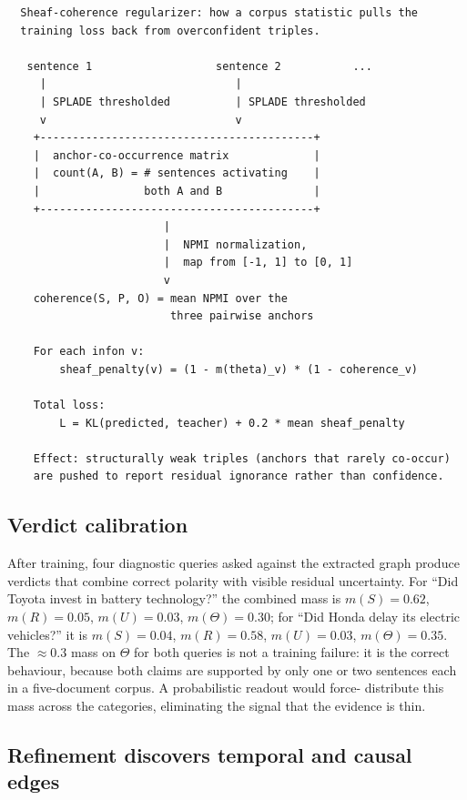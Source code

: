 \documentclass[11pt,a4paper]{article}
\begin{document}
\begin{verbatim}
  Sheaf-coherence regularizer: how a corpus statistic pulls the
  training loss back from overconfident triples.

   sentence 1                   sentence 2           ...
     |                             |
     | SPLADE thresholded          | SPLADE thresholded
     v                             v
    +------------------------------------------+
    |  anchor-co-occurrence matrix             |
    |  count(A, B) = # sentences activating    |
    |                both A and B              |
    +------------------------------------------+
                        |
                        |  NPMI normalization,
                        |  map from [-1, 1] to [0, 1]
                        v
    coherence(S, P, O) = mean NPMI over the
                         three pairwise anchors

    For each infon v:
        sheaf_penalty(v) = (1 - m(theta)_v) * (1 - coherence_v)

    Total loss:
        L = KL(predicted, teacher) + 0.2 * mean sheaf_penalty

    Effect: structurally weak triples (anchors that rarely co-occur)
    are pushed to report residual ignorance rather than confidence.
\end{verbatim}

\subsection{Verdict calibration}

After training, four diagnostic queries asked against the
extracted graph produce verdicts that combine correct polarity
with visible residual uncertainty. For ``Did Toyota invest in
battery technology?'' the combined mass is $m(S) = 0.62$,
$m(R) = 0.05$, $m(U) = 0.03$, $m(\Theta) = 0.30$; for ``Did
Honda delay its electric vehicles?'' it is $m(S) = 0.04$,
$m(R) = 0.58$, $m(U) = 0.03$, $m(\Theta) = 0.35$. The
$\approx 0.3$ mass on $\Theta$ for both queries is not a
training failure: it is the correct behaviour, because both
claims are supported by only one or two sentences each in a
five-document corpus. A probabilistic readout would force-
distribute this mass across the categories, eliminating the
signal that the evidence is thin.

\subsection{Refinement discovers temporal and causal edges}
\end{document}

